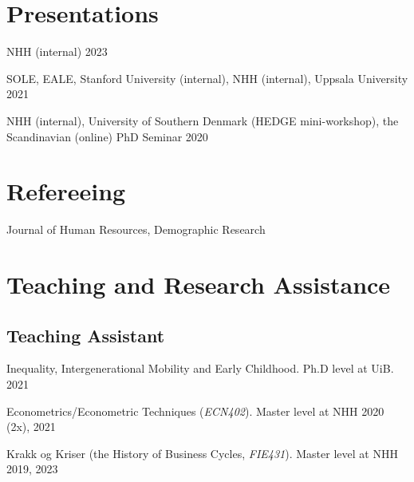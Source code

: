 \documentclass[11pt,]{article}
\begin{document}
\hypertarget{presentations}{%
\section{Presentations}\label{presentations}}

NHH (internal) \hfill 2023\vspace{-0.2cm}

SOLE, EALE, Stanford University (internal), NHH (internal), Uppsala
University \hfill 2021\vspace{-0.2cm}

NHH (internal), University of Southern Denmark (HEDGE mini-workshop),
the Scandinavian (online) PhD Seminar \hfill 2020\vspace{-0.2cm}

\vspace{0.5cm}

\hypertarget{refereeing}{%
\section{Refereeing}\label{refereeing}}

Journal of Human Resources, Demographic Research\vspace{-0.2cm}

\vspace{0.5cm}

\hypertarget{teaching-and-research-assistance}{%
\section{Teaching and Research
Assistance}\label{teaching-and-research-assistance}}

\hypertarget{teaching-assistant}{%
\subsection{Teaching Assistant}\label{teaching-assistant}}

Inequality, Intergenerational Mobility and Early Childhood. Ph.D level
at UiB. \hfill 2021\vspace{-0.2cm}

Econometrics/Econometric Techniques (\emph{ECN402}). Master level at NHH
\hfill 2020 (2x), 2021\vspace{-0.2cm}

Krakk og Kriser (the History of Business Cycles, \emph{FIE431}). Master
level at NHH \hfill 2019, 2023\vspace{-0.2cm}
\end{document}
